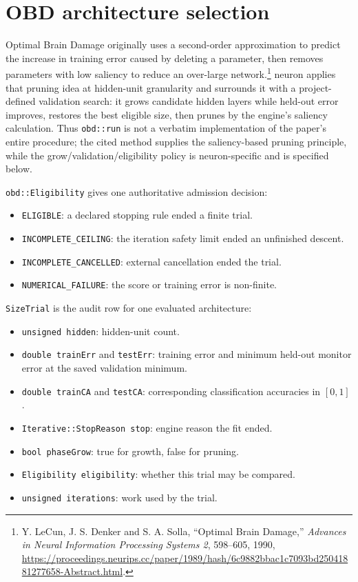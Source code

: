 \section{OBD architecture selection}\label{obd_objects}

Optimal Brain Damage originally uses a second-order approximation to predict
the increase in training error caused by deleting a parameter, then removes
parameters with low saliency to reduce an over-large network.\footnote{Y.
LeCun, J. S. Denker and S. A. Solla, ``Optimal Brain Damage,'' \emph{Advances
in Neural Information Processing Systems 2}, 598--605, 1990,
\url{https://proceedings.neurips.cc/paper/1989/hash/6c9882bbac1c7093bd25041881277658-Abstract.html}.}
neuron applies that pruning idea at hidden-unit granularity and surrounds it
with a project-defined validation search: it grows candidate hidden layers while
held-out error improves, restores the best eligible size, then prunes by the
engine's saliency calculation.  Thus \texttt{obd::run} is not a verbatim
implementation of the paper's entire procedure; the cited method supplies the
saliency-based pruning principle, while the grow/validation/eligibility policy
is neuron-specific and is specified below.

\texttt{obd::Eligibility} gives one authoritative admission decision:

\begin{itemize}
\item \texttt{ELIGIBLE}: a declared stopping rule ended a finite trial.
\item \texttt{INCOMPLETE\_CEILING}: the iteration safety limit ended an
      unfinished descent.
\item \texttt{INCOMPLETE\_CANCELLED}: external cancellation ended the trial.
\item \texttt{NUMERICAL\_FAILURE}: the score or training error is non-finite.
\end{itemize}

\texttt{SizeTrial} is the audit row for one evaluated architecture:

\begin{itemize}
\item \texttt{unsigned hidden}: hidden-unit count.
\item \texttt{double trainErr} and \texttt{testErr}: training error and minimum
      held-out monitor error at the saved validation minimum.
\item \texttt{double trainCA} and \texttt{testCA}: corresponding classification
      accuracies in $[0,1]$.
\item \texttt{Iterative::StopReason stop}: engine reason the fit ended.
\item \texttt{bool phaseGrow}: true for growth, false for pruning.
\item \texttt{Eligibility eligibility}: whether this trial may be compared.
\item \texttt{unsigned iterations}: work used by the trial.
\end{itemize}

